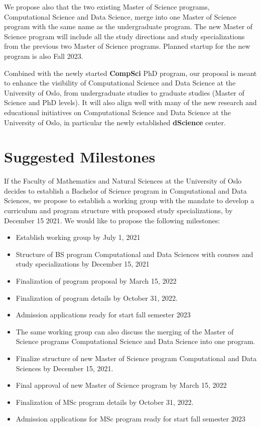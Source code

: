 \documentclass[oneside,final,10pt]{article}
\begin{document}
We propose also that the two existing Master of Science programs, Computational Science and Data Science, merge into one Master of Science program with the same name as the undergraduate program. The new Master of Science program will include all the study directions and study specializations from the previous two Master of Science programs. Planned startup for the new program is also Fall 2023. 

Combined with the newly started {\bf CompSci} PhD program, our proposal is meant to enhance the visibility of Computational Science and Data Science at the University of Oslo, from undergraduate studies to graduate studies (Master of Science and PhD levels). It will also align well with many of the new research and educational initiatives on Computational Science and Data Science at the University of Oslo, in particular the newly established {\bf dScience} center. 
\section*{Suggested Milestones}
If the Faculty of Mathematics and Natural Sciences at the University of Oslo decides to establish a Bachelor of Science program in Computational  and Data Sciences, we propose to establish a working group with the mandate  to develop a curriculum and program structure with proposed study specializations, by December 15 2021.  We would like to propose the following milestones:
\begin{itemize}
    \item Establish working group by July 1, 2021
    \item Structure of BS program Computational and Data Sciences with courses and study specializations by December 15, 2021
    \item Finalization of program proposal by March 15, 2022
    \item Finalization of program details by October 31, 2022.
    \item Admission applications ready for start fall semester 2023
    \item The same working group can also discuss the merging of the Master of Science programs Computational Science and Data Science into one program. 
    \item Finalize structure of new Master of Science program Computational and Data Sciences by December 15, 2021.
    \item Final approval of new Master of Science program by March 15, 2022
    \item Finalization of MSc program details by October 31, 2022.
    \item Admission applications for MSc program ready for start fall semester 2023
\end{itemize}
\end{document}
